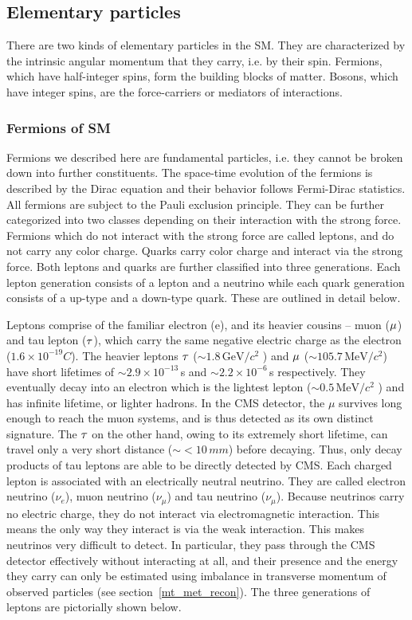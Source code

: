 \subsection{Elementary particles}
There are two kinds of elementary particles in the SM. They are characterized by the intrinsic angular momentum that they carry, i.e. by their spin. Fermions, which have half-integer spins, form the building blocks of matter. Bosons, which have integer spins, are the force-carriers or mediators of interactions.

\subsubsection{Fermions of SM}
\label{fermions}
Fermions we described here are fundamental particles, i.e. they cannot be broken down into further constituents. The space-time evolution of the fermions is described by the Dirac equation and their behavior follows Fermi-Dirac statistics. All fermions are subject to the Pauli exclusion principle. They can be further categorized into two classes depending on their interaction with the strong force. Fermions which do not interact with the strong force are called leptons, and do not carry any color charge. Quarks carry color charge and interact via the strong force. Both leptons and quarks are further classified into three generations. Each lepton generation consists of a lepton and a neutrino while each quark generation consists of a up-type and a down-type quark. These are outlined in detail below.

Leptons comprise of the familiar electron (e), and its heavier cousins -- muon ($\mu$) and tau lepton ($\tau$), which carry the same negative electric charge as the electron ($1.6\times10^{-19} C$).  The heavier leptons $\tau$ ($\sim 1.8\,\mathrm{GeV}/c^2$ ) and $\mu$ ($\sim 105.7\,\mathrm{MeV}/c^2$) have short lifetimes of $\sim 2.9\times 10^{-13}\,$s and $\sim 2.2\times 10^{-6}\,$s respectively. They eventually decay into an electron which is the lightest lepton ($\sim 0.5\,\mathrm{MeV}/c^2$ ) and has infinite lifetime, or lighter hadrons. In the CMS detector, the $\mu$ survives long enough to reach the muon systems, and is thus detected as its own distinct signature. The $\tau$ on the other hand, owing to its extremely short lifetime, can travel only a very short distance ($\sim <10\,mm$) before decaying. Thus, only decay products of tau leptons are able to be directly detected by CMS. Each charged lepton is associated with an electrically neutral neutrino. They are called electron neutrino ($\nu_e$), muon neutrino ($\nu_{\mu}$) and tau neutrino ($\nu_{\mu}$). Because neutrinos carry no electric charge, they do not interact via electromagnetic interaction. This means the only way they interact is via the weak interaction. This makes neutrinos very difficult to detect. In particular, they pass through the CMS detector effectively without interacting at all, and their presence and the energy they carry can only be estimated using imbalance in transverse momentum of observed particles (see section~\ref{mt_met_recon}). The three generations of leptons are pictorially shown below. 

